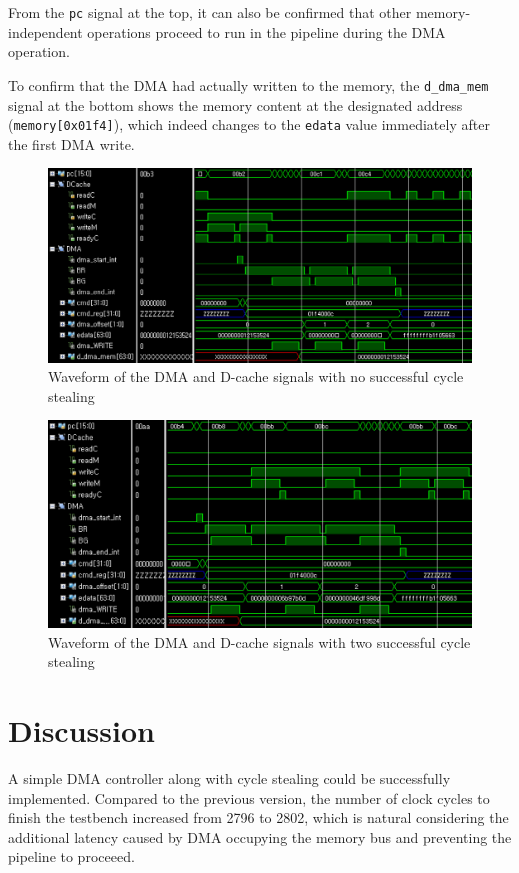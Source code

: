 \documentclass[12pt]{article}
\begin{document}
From the \verb|pc| signal at the top, it can also be confirmed that
other memory-independent operations proceed to run in the pipeline
during the DMA operation.

To confirm that the DMA had actually written to the memory, the
\verb|d_dma_mem| signal at the bottom shows the memory content at the
designated address (\verb|memory[0x01f4]|), which indeed changes to
the \verb|edata| value immediately after the first DMA write.

\begin{figure}[!ht]
  \centering
  \includegraphics[scale=0.8]{dma_cyclesteal_1}
  \caption{Waveform of the DMA and D-cache signals with no successful cycle stealing}
  \label{fig:waveform1}
\end{figure}

\begin{figure}[!ht]
  \centering
  \includegraphics[scale=0.8]{dma_cyclesteal_2}
  \caption{Waveform of the DMA and D-cache signals with two successful cycle stealing}
  \label{fig:waveform2}
\end{figure}

\section{Discussion}
A simple DMA controller along with cycle stealing could be
successfully implemented.  Compared to the previous version, the
number of clock cycles to finish the testbench increased from 2796 to
2802, which is natural considering the additional latency caused by
DMA occupying the memory bus and preventing the pipeline to proceeed.
\end{document}
